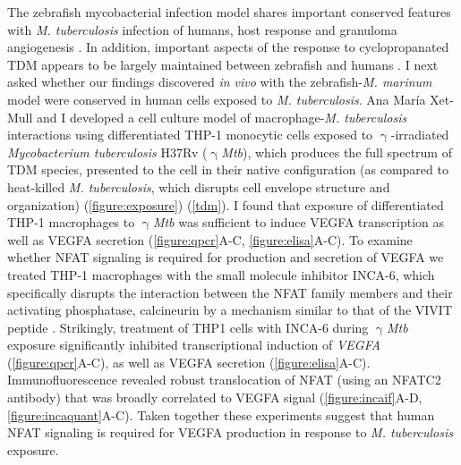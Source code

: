 The zebrafish mycobacterial infection model shares important conserved features with \textit{M. tuberculosis} infection of humans, host response and granuloma angiogenesis \citep{Swaim2006, Datta2015, Oehlers2015, Cronan2016, Cronan2021}. In addition, important aspects of the response to cyclopropanated TDM appears to be largely maintained between zebrafish and humans \citep{Rao2005, Walton2018}. I next asked whether our findings discovered \textit{in vivo} with the zebrafish\hyp{}\textit{M. marinum} model were conserved in human cells exposed to \textit{M. tuberculosis}. Ana Mar\'{i}a Xet\hyp{}Mull and I developed a cell culture model of macrophage\hyp{}\textit{M. tuberculosis} interactions using differentiated THP\hyp{}1 monocytic cells exposed to $\upgamma$\hyp{}irradiated \textit{Mycobacterium tuberculosis} H37Rv ($\upgamma$\textit{Mtb}), which produces the full spectrum of TDM species, presented to the cell in their native configuration (as compared to heat\hyp{}killed \textit{M. tuberculosis}, which disrupts cell envelope structure and organization) \citep{Romero2014, SecanellaFandos2014} (\autoref{figure:exposure}) (\autoref{tdm}). I found that exposure of differentiated THP\hyp{}1 macrophages to $\upgamma$\textit{Mtb} was sufficient to induce VEGFA transcription as well as VEGFA secretion (\autoref{figure:qpcr}A\hyp{}C, \autoref{figure:elisa}A\hyp{}C). To examine whether NFAT signaling is required for production and secretion of VEGFA we treated THP\hyp{}1 macrophages with the small molecule inhibitor INCA\hyp{}6, which specifically disrupts the interaction between the NFAT family members and their activating phosphatase, calcineurin by a mechanism similar to that of the VIVIT peptide \citep{Roehrl2004a, Roehrl2004b}. Strikingly, treatment of THP1 cells with INCA\hyp{}6 during $\upgamma$\textit{Mtb} exposure significantly inhibited transcriptional induction of \textit{VEGFA} (\autoref{figure:qpcr}A\hyp{}C), as well as VEGFA secretion (\autoref{figure:elisa}A\hyp{}C). Immunofluorescence revealed robust translocation of NFAT (using an NFATC2 antibody) that was broadly correlated to VEGFA signal (\autoref{figure:incaif}A\hyp{}D, \autoref{figure:incaquant}A\hyp{}C). Taken together these experiments suggest that human NFAT signaling is required for VEGFA production in response to \textit{M. tuberculosis} exposure.

